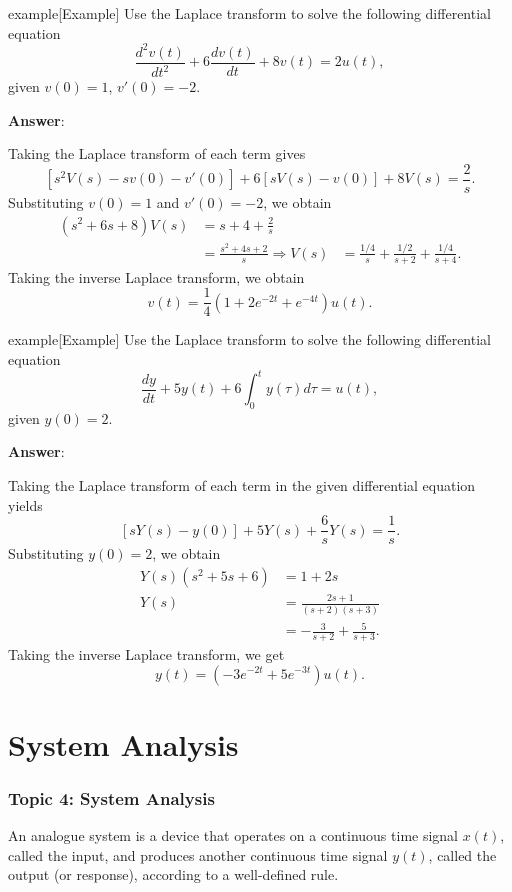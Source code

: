 \documentclass{article}
\begin{document}
\begin{callout}{example}[Example]
\label{example:s4-e3}
Use the Laplace transform to solve the following differential equation
\[
    \frac{d^2v(t)}{d t^2}+6 \frac{d v(t)}{d t}+8v(t)=2u(t),
\]
given $v(0)=1$, $v'(0)=-2$.

\textbf{Answer}:

Taking the Laplace transform of each term gives
\[
    \left[ s^2V(s)-sv(0)-v'(0) \right]+6 \left[ sV(s)-v(0) \right]+8V(s)=\frac{2}{s}.
\]
Substituting $v(0)=1$ and $v'(0)=-2$, we obtain
\begin{align*}
    (s^2+6s+8)V(s) &= s+4+\frac{2}{s} \\
                   &= \frac{s^2+4s+2}{s}
    \Rightarrow V(s) &= \frac{1/4}{s}+\frac{1/2}{s+2}+\frac{1/4}{s+4}.
\end{align*}
Taking the inverse Laplace transform, we obtain
\[
    v(t)=\frac{1}{4}(1+2e^{-2t}+e^{-4t})u(t).
\]
\end{callout}

\begin{callout}{example}[Example]
\label{example:s4-e4}
Use the Laplace transform to solve the following differential equation
\[
    \frac{d y}{d t}+5y(t)+6 \int_0^ty(\tau )d\tau =u(t),
\]
given $y(0)=2$.

\textbf{Answer}:

Taking the Laplace transform of each term in the given differential equation yields
\[
    \left[ sY(s)-y(0) \right]+5Y(s)+\frac{6}{s}Y(s)=\frac{1}{s}.
\]
Substituting $y(0)=2$, we obtain
\begin{align*}
    Y(s)(s^2+5s+6) &= 1+2s \\
    Y(s) &= \frac{2s+1}{(s+2)(s+3)} \\
    &= -\frac{3}{s+2}+\frac{5}{s+3}.
\end{align*}
Taking the inverse Laplace transform, we get
\[
    y(t)=(-3e^{-2t}+5e^{-3t})u(t).
\]
\end{callout}

\part{System Analysis}
\section{Topic 4: System Analysis}
An analogue system is a device that operates on a continuous time signal $x(t)$, called the input, and produces another continuous time signal $y(t)$, called the output (or response), according to a well-defined rule.
\end{document}

